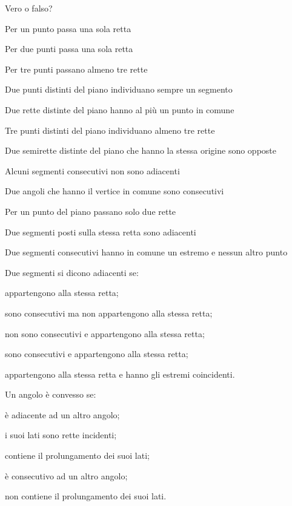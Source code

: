 \begin{esercizio}
\label{ese:1.49}
Vero o falso?
\begin{enumeratea}
\item Per un punto passa una sola retta		\hfill\boxV\quad\boxF
\item Per due punti passa una sola retta		
\hfill\boxV\quad\boxF
\item Per tre punti passano almeno tre rette	\hfill\boxV\quad\boxF
\item Due punti distinti del piano individuano sempre un 
segmento	\hfill\boxV\quad\boxF
\item Due rette distinte del piano hanno al più un punto in 
comune	\hfill\boxV\quad\boxF
\item Tre punti distinti del piano individuano almeno tre rette	
\hfill\boxV\quad\boxF
\item Due semirette distinte del piano che hanno la stessa origine 
sono opposte	\hfill\boxV\quad\boxF
\item Alcuni segmenti consecutivi non sono adiacenti		
\hfill\boxV\quad\boxF
\item Due angoli che hanno il vertice in comune sono 
consecutivi		\hfill\boxV\quad\boxF
\item Per un punto del piano passano solo due rette		
\hfill\boxV\quad\boxF
\item Due segmenti posti sulla stessa retta sono adiacenti	
\hfill\boxV\quad\boxF
\item Due segmenti consecutivi hanno in comune un estremo e nessun 
altro punto		\hfill\boxV\quad\boxF
\end{enumeratea}
\end{esercizio}

\begin{esercizio}
\label{ese:1.50}
Due segmenti si dicono adiacenti se:
\begin{enumeratea}
\item appartengono alla stessa retta;
\item sono consecutivi ma non appartengono alla stessa retta;
\item non sono consecutivi e appartengono alla stessa retta;
\item sono consecutivi e appartengono alla stessa retta;
\item appartengono alla stessa retta e hanno gli estremi coincidenti.
\end{enumeratea}
\end{esercizio}

\begin{esercizio}
\label{ese:1.51}
Un angolo è convesso se:
\begin{enumeratea}
\item è adiacente ad un altro angolo;
\item i suoi lati sono rette incidenti;
\item contiene il prolungamento dei suoi lati;
\item è consecutivo ad un altro angolo;
\item non contiene il prolungamento dei suoi lati.
\end{enumeratea}
\end{esercizio}

